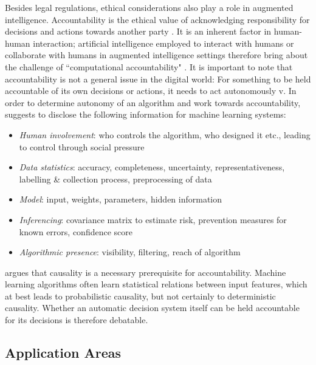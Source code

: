 Besides legal regulations, ethical considerations also play a role in augmented intelligence. Accountability is the ethical value of acknowledging responsibility for decisions and actions towards another party \cite{baldoni2016computational}. It is an inherent factor in human-human interaction; artificial intelligence employed to interact with humans or collaborate with humans in augmented intelligence settings therefore bring about the challenge of ``computational accountability" \cite{baldoni2016computational}. It is important to note that accountability is not a general issue in the digital world: For something to be held accountable of its own decisions or actions, it needs to act autonomously v. In order to determine autonomy of an algorithm and work towards accountability, \cite{diakopoulos2016accountability} suggests to disclose the following information for machine learning systems: 
\begin{itemize}
	\item \textit{Human involvement}: who controls the algorithm, who designed it etc., leading to control through social pressure
	\item \textit{Data statistics}: accuracy, completeness, uncertainty, representativeness, labelling \& collection process, preprocessing of data
	\item \textit{Model}: input, weights, parameters, hidden information
	\item \textit{Inferencing}: covariance matrix to estimate risk, prevention measures for known errors, confidence score 
	\item \textit{Algorithmic presence}: visibility, filtering, reach of algorithm
\end{itemize}
\cite{baldoni2016computational} argues that causality is a necessary prerequisite for accountability. Machine learning algorithms often learn statistical relations between input features, which at best leads to probabilistic causality, but not certainly to deterministic causality. Whether an automatic decision system itself can be held accountable for its decisions is therefore debatable.







\subsection{Application Areas}

